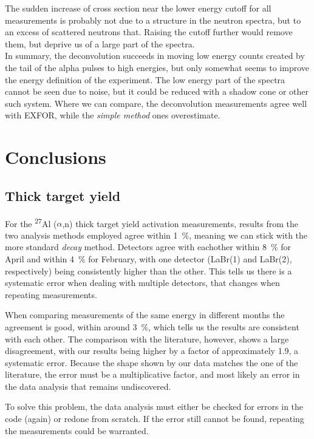 \documentclass[a4paper,12pt]{report}
\newcommand{\an}{($\alpha$,n) }
\newcommand{\Aliso}{\textsuperscript{27}Al }
\begin{document}
The sudden increase of cross section near the lower energy cutoff for all measurements is probably not due to a structure in the neutron spectra, but to an excess of scattered neutrons that.
Raising the cutoff further would remove them, but deprive us of a large part of the spectra.
\\

In summary, the deconvolution succeeds in moving low energy counts created by the tail of the alpha pulses to high energies, but only somewhat seems to improve the energy definition of the experiment.
The low energy part of the spectra cannot be seen due to noise, but it could be reduced with a shadow cone or other such system.
Where we can compare, the deconvolution measurements agree well with EXFOR, while the \textit{simple method} ones overestimate.

\chapter{Conclusions}
\section{Thick target yield}
For the \Aliso\an thick target yield activation measurements, results from the two analysis methods employed agree within \qty{1}{\percent}, meaning we can stick with the more standard \textit{decay} method.
Detectors agree with eachother within \qty{8}{\percent} for April and within \qty{4}{\percent} for February, with one detector (LaBr(1) and LaBr(2), respectively) being consistently higher than the other.
This tells us there is a systematic error when dealing with multiple detectors, that changes when repeating measurements.

When comparing measurements of the same energy in different months the agreement is good, within around \qty{3}{\percent}, which tells us the results are consistent with each other.
The comparison with the literature, however, shows a large disagreement, with our results being higher by a factor of approximately \num{1.9}, a systematic error.
Because the shape shown by our data matches the one of the literature, the error must be a multiplicative factor, and most likely an error in the data analysis that remains undiscovered.

To solve this problem, the data analysis must either be checked for errors in the code (again) or redone from scratch.
If the error still cannot be found, repeating the measurements could be warranted.
\\
\end{document}
